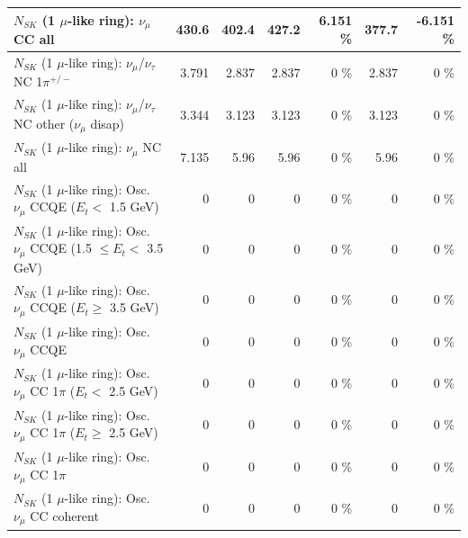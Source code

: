 \begin{table}
\begin{tabular}{| l | r | r | r  r | r  r |}
                                $N_{SK}$ (1 $\mu$-like ring): $\nu_{\mu}$ CC all &           430.6 &           402.4 &           427.2 &    6.151 \%  &           377.7 &   -6.151 \%  \\ 
\hline
              $N_{SK}$ (1 $\mu$-like ring): $\nu_\mu$/$\nu_\tau$ NC 1$\pi^{+/-}$ &           3.791 &           2.837 &           2.837 &        0 \%  &           2.837 &        0 \%  \\ 
   $N_{SK}$ (1 $\mu$-like ring): $\nu_\mu$/$\nu_\tau$ NC other ($\nu_\mu$ disap) &           3.344 &           3.123 &           3.123 &        0 \%  &           3.123 &        0 \%  \\ 
                                $N_{SK}$ (1 $\mu$-like ring): $\nu_{\mu}$ NC all &           7.135 &            5.96 &            5.96 &        0 \%  &            5.96 &        0 \%  \\ 
\hline
\hline
           $N_{SK}$ (1 $\mu$-like ring): Osc. $\nu_\mu$ CCQE ($E_{t} <$ 1.5 GeV) &               0 &               0 &               0 &        0 \%  &               0 &        0 \%  \\ 
  $N_{SK}$ (1 $\mu$-like ring): Osc. $\nu_\mu$ CCQE (1.5 $\leq E_{t} <$ 3.5 GeV) &               0 &               0 &               0 &        0 \%  &               0 &        0 \%  \\ 
        $N_{SK}$ (1 $\mu$-like ring): Osc. $\nu_\mu$ CCQE ($E_{t} \geq$ 3.5 GeV) &               0 &               0 &               0 &        0 \%  &               0 &        0 \%  \\ 
\hline
                               $N_{SK}$ (1 $\mu$-like ring): Osc. $\nu_\mu$ CCQE &               0 &               0 &               0 &        0 \%  &               0 &        0 \%  \\ 
\hline
      $N_{SK}$ (1 $\mu$-like ring): Osc. $\nu_\mu$ CC 1$\pi$ ($E_{t} <$ 2.5 GeV) &               0 &               0 &               0 &        0 \%  &               0 &        0 \%  \\ 
   $N_{SK}$ (1 $\mu$-like ring): Osc. $\nu_\mu$ CC 1$\pi$ ($E_{t} \geq$ 2.5 GeV) &               0 &               0 &               0 &        0 \%  &               0 &        0 \%  \\ 
\hline
                          $N_{SK}$ (1 $\mu$-like ring): Osc. $\nu_\mu$ CC 1$\pi$ &               0 &               0 &               0 &        0 \%  &               0 &        0 \%  \\ 
                        $N_{SK}$ (1 $\mu$-like ring): Osc. $\nu_\mu$ CC coherent &               0 &               0 &               0 &        0 \%  &               0 &        0 \%  \\ 

\end{tabular}
\end{table}
